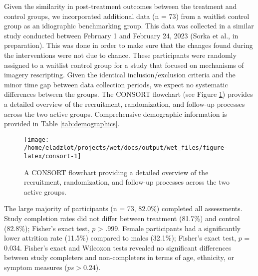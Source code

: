 \documentclass[
  man,floatsintext]{apa7}
\begin{document}
Given the similarity in post-treatment outcomes between the treatment and control groups, we incorporated additional data (n = 73) from a waitlist control group as an idiographic benchmarking group.
This data was collected in a similar study conducted between February 1 and February 24, 2023 (Sorka et al., in preparation).
This was done in order to make sure that the changes found during the interventions were not due to chance.
These participants were randomly assigned to a waitlist control group for a study that focused on mechanisms of imagery rescripting.
Given the identical inclusion/exclusion criteria and the minor time gap between data collection periods, we expect no systematic differences between the groups.
The CONSORT flowchart (see Figure \ref{fig:consort}) provides a detailed overview of the recruitment, randomization, and follow-up processes across the two active groups.
Comprehensive demographic information is provided in Table \ref{tab:demographics}.



\begin{figure}
\texttt{[image: /home/eladzlot/projects/wet/docs/output/wet\_files/figure-latex/consort-1]} \caption{A CONSORT flowchart providing a detailed overview of the recruitment, randomization, and follow-up processes across the two active groups.}\label{fig:consort}
\end{figure}

The large majority of participants (n = 73, 82.0\%) completed all assessments.
Study completion rates did not differ between treatment (81.7\%) and control (82.8\%); Fisher's exact test, \(p\) \textgreater{} .999.
Female participants had a significantly lower attrition rate (11.5\%) compared to males (32.1\%); Fisher's exact test, \(p\) = 0.034.
Fisher's exact and Wilcoxon tests revealed no significant differences between study completers and non-completers in terms of age, ethnicity, or symptom measures (\(ps > 0.24\)).
\end{document}
